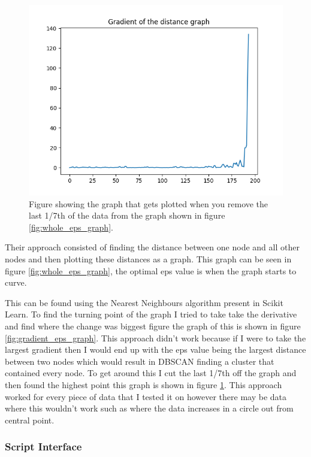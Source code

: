 \begin{figure}[h]
    \centering
    \includegraphics[width=\textwidth]{figures/eps_finder_graph_gradient.png}
    \caption{Figure showing the graph that gets plotted when you remove the last 1/7th of the data from the graph shown in figure \ref{fig:whole_eps_graph}.}
    \label{fig:cut_eps_graph}
\end{figure}

Their approach consisted of finding the distance between one node and all other nodes and then plotting these distances as a graph. This graph can be seen in figure \ref{fig:whole_eps_graph}, the optimal eps value is when the graph starts to curve. 

This can be found using the Nearest Neighbours algorithm present in Scikit Learn\cite{scikit_learn_nearest_neighbours}. To find the turning point of the graph I tried to take take the derivative and find where the change was biggest figure the graph of this is shown in figure \ref{fig:gradient_eps_graph}. This approach didn't work because if I were to take the largest gradient then I would end up with the eps value being the largest distance between two nodes which would result in DBSCAN finding a cluster that contained every node. To get around this I cut the last 1/7th off the graph and then found the highest point this graph is shown in figure \ref{fig:cut_eps_graph}. This approach worked for every piece of data that I tested it on however there may be data where this wouldn't work such as where the data increases in a circle out from central point.

\subsubsection{Script Interface}

